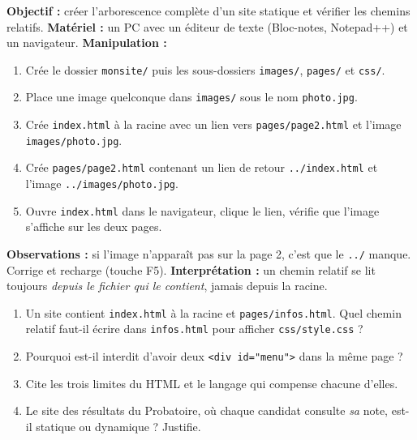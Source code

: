 \documentclass[11pt]{article}
\begin{document}
\begin{experience}
\textbf{Objectif :} créer l'arborescence complète d'un site statique et vérifier les chemins relatifs.
\textbf{Matériel :} un PC avec un éditeur de texte (Bloc-notes, Notepad++) et un navigateur.
\textbf{Manipulation :}
\begin{enumerate}
  \item Crée le dossier \texttt{monsite/} puis les sous-dossiers \texttt{images/}, \texttt{pages/} et \texttt{css/}.
  \item Place une image quelconque dans \texttt{images/} sous le nom \texttt{photo.jpg}.
  \item Crée \texttt{index.html} à la racine avec un lien vers \texttt{pages/page2.html} et l'image \texttt{images/photo.jpg}.
  \item Crée \texttt{pages/page2.html} contenant un lien de retour \texttt{../index.html} et l'image \texttt{../images/photo.jpg}.
  \item Ouvre \texttt{index.html} dans le navigateur, clique le lien, vérifie que l'image s'affiche sur les deux pages.
\end{enumerate}
\textbf{Observations :} si l'image n'apparaît pas sur la page 2, c'est que le \texttt{../} manque. Corrige et recharge (touche F5).
\textbf{Interprétation :} un chemin relatif se lit toujours \emph{depuis le fichier qui le contient}, jamais depuis la racine.
\end{experience}

\begin{exercice}
\begin{enumerate}
  \item Un site contient \texttt{index.html} à la racine et \texttt{pages/infos.html}. Quel chemin relatif faut-il écrire dans \texttt{infos.html} pour afficher \texttt{css/style.css} ?
  \item Pourquoi est-il interdit d'avoir deux \texttt{<div id="menu">} dans la même page ?
  \item Cite les trois limites du HTML et le langage qui compense chacune d'elles.
  \item Le site des résultats du Probatoire, où chaque candidat consulte \emph{sa} note, est-il statique ou dynamique ? Justifie.
\end{enumerate}
\end{exercice}
\end{document}
